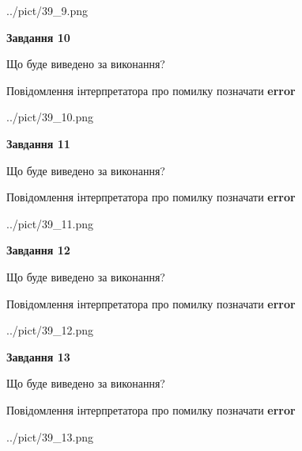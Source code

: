 \documentclass[11pt, ukrainian]{article}
\begin{document}
{\begin {large}
\begin{center}
	{../pict/39_9.png}
\end{center}
\newpage

{\begin {center}\textbf{Завдання 10}\end {center}}\par
Що буде виведено за виконання? \par
Повідомлення інтерпретатора про помилку позначати \textbf{error}

\begin{center}
	{../pict/39_10.png}
\end{center}
\newpage

{\begin {center}\textbf{Завдання 11}\end {center}}\par
Що буде виведено за виконання? \par
Повідомлення інтерпретатора про помилку позначати \textbf{error}

\begin{center}
	{../pict/39_11.png}
\end{center}
\newpage

{\begin {center}\textbf{Завдання 12}\end {center}}\par
Що буде виведено за виконання? \par
Повідомлення інтерпретатора про помилку позначати \textbf{error}

\begin{center}
	{../pict/39_12.png}
\end{center}
\newpage

{\begin {center}\textbf{Завдання 13}\end {center}}\par
Що буде виведено за виконання? \par
Повідомлення інтерпретатора про помилку позначати \textbf{error}

\begin{center}
	{../pict/39_13.png}
\end{center}
\newpage


\end{large}}
\end{document}
